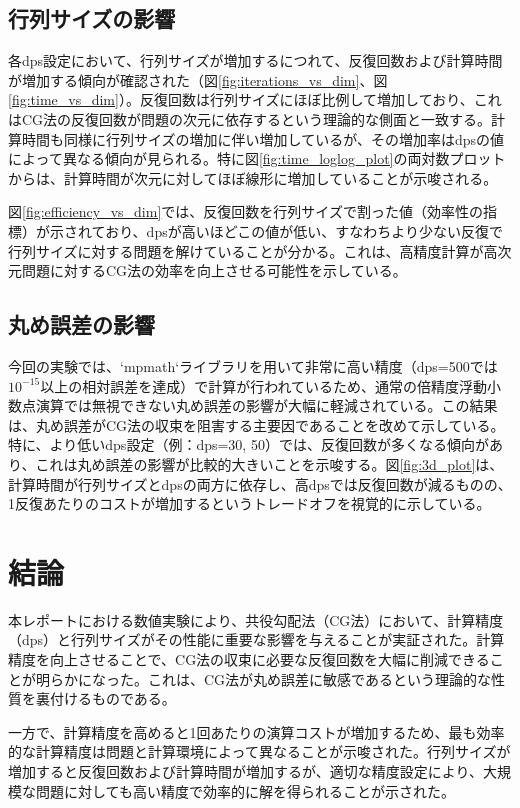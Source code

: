 \documentclass{article}
\begin{document}
\subsection{行列サイズの影響}
各dps設定において、行列サイズが増加するにつれて、反復回数および計算時間が増加する傾向が確認された（図\ref{fig:iterations_vs_dim}、図\ref{fig:time_vs_dim}）。反復回数は行列サイズにほぼ比例して増加しており、これはCG法の反復回数が問題の次元に依存するという理論的な側面と一致する。計算時間も同様に行列サイズの増加に伴い増加しているが、その増加率はdpsの値によって異なる傾向が見られる。特に図\ref{fig:time_loglog_plot}の両対数プロットからは、計算時間が次元に対してほぼ線形に増加していることが示唆される。

図\ref{fig:efficiency_vs_dim}では、反復回数を行列サイズで割った値（効率性の指標）が示されており、dpsが高いほどこの値が低い、すなわちより少ない反復で行列サイズに対する問題を解けていることが分かる。これは、高精度計算が高次元問題に対するCG法の効率を向上させる可能性を示している。

\subsection{丸め誤差の影響}
今回の実験では、`mpmath`ライブラリを用いて非常に高い精度（dps=500では$10^{-15}$以上の相対誤差を達成）で計算が行われているため、通常の倍精度浮動小数点演算では無視できない丸め誤差の影響が大幅に軽減されている。この結果は、丸め誤差がCG法の収束を阻害する主要因であることを改めて示している。特に、より低いdps設定（例：dps=30, 50）では、反復回数が多くなる傾向があり、これは丸め誤差の影響が比較的大きいことを示唆する。図\ref{fig:3d_plot}は、計算時間が行列サイズとdpsの両方に依存し、高dpsでは反復回数が減るものの、1反復あたりのコストが増加するというトレードオフを視覚的に示している。

\section{結論}
本レポートにおける数値実験により、共役勾配法（CG法）において、計算精度（dps）と行列サイズがその性能に重要な影響を与えることが実証された。計算精度を向上させることで、CG法の収束に必要な反復回数を大幅に削減できることが明らかになった。これは、CG法が丸め誤差に敏感であるという理論的な性質を裏付けるものである。

一方で、計算精度を高めると1回あたりの演算コストが増加するため、最も効率的な計算精度は問題と計算環境によって異なることが示唆された。行列サイズが増加すると反復回数および計算時間が増加するが、適切な精度設定により、大規模な問題に対しても高い精度で効率的に解を得られることが示された。
\end{document}
